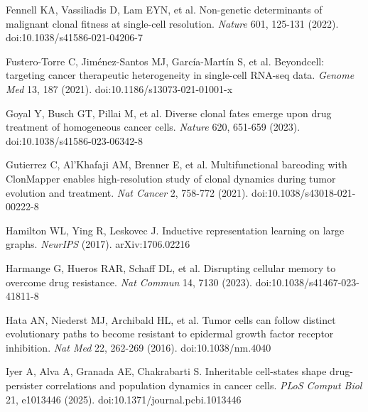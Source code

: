 \documentclass[11pt,a4paper]{article}
\begin{document}
\noindent Fennell KA, Vassiliadis D, Lam EYN, et al. Non-genetic determinants of malignant clonal fitness at single-cell resolution. \emph{Nature} 601, 125-131 (2022). doi:10.1038/s41586-021-04206-7\par\vspace{2pt}

\noindent Fustero-Torre C, Jim\'enez-Santos MJ, Garc\'ia-Mart\'in S, et al. Beyondcell: targeting cancer therapeutic heterogeneity in single-cell RNA-seq data. \emph{Genome Med} 13, 187 (2021). doi:10.1186/s13073-021-01001-x \par\vspace{2pt}

\noindent Goyal Y, Busch GT, Pillai M, et al. Diverse clonal fates emerge upon drug treatment of homogeneous cancer cells. \emph{Nature} 620, 651-659 (2023). doi:10.1038/s41586-023-06342-8 \par\vspace{2pt}

\noindent Gutierrez C, Al'Khafaji AM, Brenner E, et al. Multifunctional barcoding with ClonMapper enables high-resolution study of clonal dynamics during tumor evolution and treatment. \emph{Nat Cancer} 2, 758-772 (2021). doi:10.1038/s43018-021-00222-8 \par\vspace{2pt}

\noindent Hamilton WL, Ying R, Leskovec J. Inductive representation learning on large graphs. \emph{NeurIPS} (2017). arXiv:1706.02216\par\vspace{2pt}

\noindent Harmange G, Hueros RAR, Schaff DL, et al. Disrupting cellular memory to overcome drug resistance. \emph{Nat Commun} 14, 7130 (2023). doi:10.1038/s41467-023-41811-8 \par\vspace{2pt}

\noindent Hata AN, Niederst MJ, Archibald HL, et al. Tumor cells can follow distinct evolutionary paths to become resistant to epidermal growth factor receptor inhibition. \emph{Nat Med} 22, 262-269 (2016). doi:10.1038/nm.4040 \par\vspace{2pt}

\noindent Iyer A, Alva A, Granada AE, Chakrabarti S. Inheritable cell-states shape drug-persister correlations and population dynamics in cancer cells. \emph{PLoS Comput Biol} 21, e1013446 (2025). doi:10.1371/journal.pcbi.1013446 \par\vspace{2pt}
\end{document}
